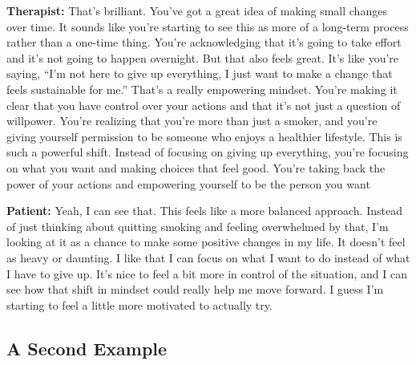 \noindent\textbf{Therapist:} That's brilliant. You've got a great idea of making small changes over time. It sounds like you're starting to see this as more of a long-term process rather than a one-time thing. You're acknowledging that it's going to take effort and it's not going to happen overnight. But that also feels great. It's like you're saying, ``I'm not here to give up everything, I just want to make a change that feels sustainable for me.'' That's a really empowering mindset. You're making it clear that you have control over your actions and that it's not just a question of willpower. You're realizing that you're more than just a smoker, and you're giving yourself permission to be someone who enjoys a healthier lifestyle. This is such a powerful shift. Instead of focusing on giving up everything, you're focusing on what you want and making choices that feel good. You're taking back the power of your actions and empowering yourself to be the person you want

\noindent\textbf{Patient:} Yeah, I can see that. This feels like a more balanced approach. Instead of just thinking about quitting smoking and feeling overwhelmed by that, I'm looking at it as a chance to make some positive changes in my life. It doesn't feel as heavy or daunting. I like that I can focus on what I want to do instead of what I have to give up. It's nice to feel a bit more in control of the situation, and I can see how that shift in mindset could really help me move forward. I guess I'm starting to feel a little more motivated to actually try.


\normalsize

\subsection{A Second Example}
\label{app:example-drawn}

